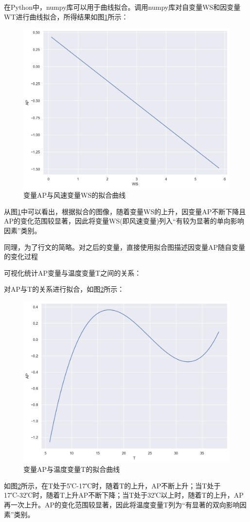 \documentclass[bwprint]{gmcmthesis}
\numberwithin{figure}{section}
\begin{document}
在Python中，numpy库可以用于曲线拟合。调用numpy库对自变量WS和因变量WT进行曲线拟合，所得结果如图\ref{fig3-6}所示：
\begin{figure}[!h]
	\centering
	\includegraphics[width=.7\textwidth]{figures//fig_WS_fit.png}
	\caption{变量AP与风速变量WS的拟合曲线}
	\label{fig3-6}
\end{figure}

从图\ref{fig3-6}中可以看出，根据拟合的图像，随着变量WS的上升，因变量AP不断下降且AP的变化范围较显著，因此将变量WS(即风速变量)列入“有较为显著的单向影响因素”类别。

同理，为了行文的简略。对之后的变量，直接使用拟合图描述因变量AP随自变量的变化过程

 可视化统计AP变量与温度变量T之间的关系：

对AP与T的关系进行拟合，如图\ref{fig3-7}所示：
\begin{figure}[!h]
	\centering
	\includegraphics[width=.7\textwidth]{figures//fig_T_fit.png}
	\caption{变量AP与温度变量T的拟合曲线}
	\label{fig3-7}
\end{figure}

如图\ref{fig3-7}所示，在T处于5℃-17℃时，随着T的上升，AP不断上升；当T处于17℃-32℃时，随着T上升AP不断下降；当T处于32℃以上时，随着T的上升，AP再一次上升。AP的变化范围较显著，因此将温度变量T列为“有显著的双向影响因素”类别。
\end{document}

